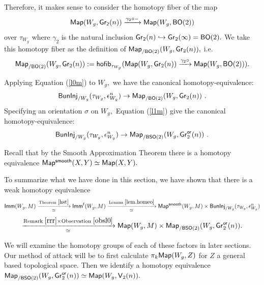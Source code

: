 Therefore, it makes sense to consider the homotopy fiber of the map \[
{\sf Map}(W_{g}, {\sf Gr_{2}}(n)) \xrightarrow{\gamma_{2} \circ -} {\sf Map}(W_{g}, {\sf BO}(2))\] over $\tau_{W_{g}}$ where $\gamma_{2}$ is the natural inclusion $\operatorname{\sf Gr}_2(n) \hookrightarrow \operatorname{\sf Gr}_{2}(\infty) = {\sf BO}(2).$ We take this homotopy fiber as the definition of ${\sf Map}_{/{\sf BO}(2)}(W_{g}, \operatorname{\sf Gr}_2(n)),$ i.e.
\[
{\sf Map}_{/{\sf BO}(2)}(W_{g}, \operatorname{\sf Gr}_2(n)) := {\sf hofib}_{\tau_{W_{g}}}({\sf Map}(W_{g}, \operatorname{\sf Gr}_{2}(n)) \xrightarrow{\gamma_{2} \circ } {\sf Map}(W_{g}, {\sf BO}(2))).
\]





\begin{observation} \label{obsl0}
Applying Equation (\ref{l0m}) to $W_{g},$ we have the canonical homotopy-equivalence:  
\[
{\sf BunInj}_{/W_{g}}(\tau_{W_{g}}, \epsilon_{W_{g}}^{n}) \rightarrow {\sf Map}_{/{\sf BO}(2)}(W_{g}, \operatorname{\sf Gr}_2(n))~.
\]
Specifying an orientation $\sigma$ on $W_{g},$ Equation (\ref{l1m}) give the canonical homotopy-equivalence:
\[
{\sf BunInj}_{/W_{g}}(\tau_{W_{g}}, \epsilon_{W_{g}}^{n}) \rightarrow {\sf Map}_{/{\sf BSO}(2)}(W_{g}, \operatorname{\sf Gr}_2^{\sf or}(n))~.
\]
\end{observation}


\begin{remark} \label{rrr}
Recall that by the Smooth Approximation Theorem \cite{Woc} there is a homotopy equivalence ${\sf Map^{smooth}}(X, Y) \simeq {\sf Map}(X, Y).$
\end{remark}

To summarize what we have done in this section, we have shown that there is a weak homotopy equivalence 
\begin{equation} \label{heeq}
{\sf Imm}(W_{g}, M) \xrightarrow[\simeq]{\text{Theorem }\ref{hst}} {\sf Imm^{f}}(W_{g}, M) \xrightarrow[\simeq]{\text{Lemma }\ref{lem.homeo}} {\sf Map^{smooth}}(W_{g}, M) \times {\sf BunInj}_{/W_{g}}(\tau_{W_{g}}, \epsilon_{W_{g}}^{n}) 
\end{equation}
\[
\xrightarrow[\simeq]{\text{Remark } \ref{rrr} \times \text{Observation }\ref{obsl0}} {\sf Map}(W_{g}, M) \times {\sf Map}_{/{\sf BSO}(2)}(W_{g}, \operatorname{\sf Gr}_2^{\sf or}(n)).
\]

We will examine the homotopy groups of each of these factors in later sections. Our method of attack will be to first calculate $\pi_{k}{\sf Map}(W_{g}, Z)$ for $Z$ a general based topological space. Then we identify a homotopy equivalence ${\sf Map}_{/{\sf BSO}(2)}(W_{g}, \operatorname{\sf Gr}_2^{\sf or}(n)) \simeq {\sf Map}(W_{g}, \mathsf V_{2}(n)).$









